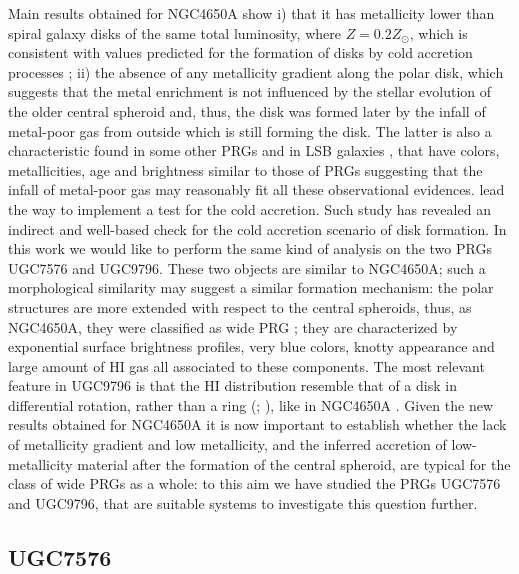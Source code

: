 \documentclass{aa}
\begin{document}
Main results obtained for NGC4650A show i) that it has metallicity
lower than spiral galaxy disks of the same total luminosity, where $Z
= 0.2Z_{\odot}$, which is consistent with values predicted for the
formation of disks by cold accretion processes \citep{Age09}; ii) the
absence of any metallicity gradient along the polar disk, which
suggests that the metal enrichment is not influenced by the stellar
evolution of the older central spheroid and, thus, the disk was formed
later by the infall of metal-poor gas from outside which is still
forming the disk. The latter is also a characteristic found in some
other PRGs \citep{Bros09} and in LSB galaxies \citep{deB98}, that
  have colors, metallicities, age and brightness similar to those of
  PRGs suggesting that the infall of metal-poor gas may reasonably fit
  all these observational evidences. \citet{Spav10} lead the way to
implement a test for the cold accretion. Such study has revealed an
indirect and well-based check for the cold accretion scenario of disk
formation. In this work we would like to perform the same kind of
analysis on the two PRGs UGC7576 and UGC9796. These two objects are
similar to NGC4650A; such a morphological similarity may suggest a
similar formation mechanism: the polar structures are more extended
with respect to the central spheroids, thus, as NGC4650A, they were
classified as wide PRG \citep{Whi90}; they are characterized by
exponential surface brightness profiles, very blue colors, knotty
appearance and large amount of HI gas all associated to these
components. The most relevant feature in UGC9796 is that the HI
distribution resemble that of a disk in differential rotation, rather
than a ring (\citealt{Res94p}; \citealt{Cox06}), like in NGC4650A
\citep{Arn97}. Given the new results obtained for NGC4650A it is now
important to establish whether the lack of metallicity gradient and
low metallicity, and the inferred accretion of low-metallicity
material after the formation of the central spheroid, are typical for
the class of wide PRGs as a whole: to this aim we have studied the
PRGs UGC7576 and UGC9796, that are suitable systems to investigate
this question further.


\subsection{UGC7576} \label{7576}
\end{document}
